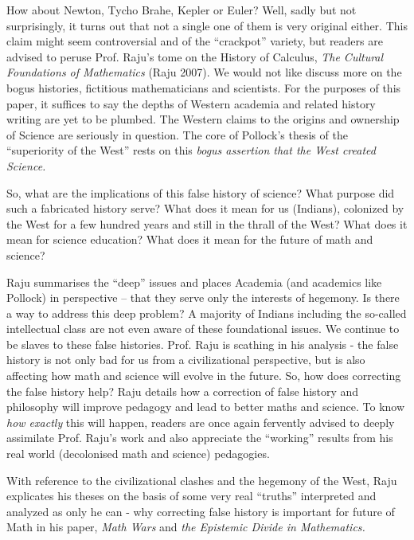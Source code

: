 How about Newton, Tycho Brahe, Kepler or Euler? Well, sadly but not surprisingly, it turns out that not a single one of them is very original either. This claim might seem controversial and of the “crackpot” variety, but readers are advised to peruse Prof. Raju’s tome on the History of Calculus, \textit{The Cultural Foundations of Mathematics} (Raju 2007). We would not like discuss more on the bogus histories, fictitious mathematicians and scientists. For the purposes of this paper, it suffices to say the depths of Western academia and related history writing are yet to be plumbed. The Western claims to the origins and ownership of Science are seriously in question. The core of Pollock’s thesis of the “superiority of the West” rests on this \textit{bogus assertion that the West created Science.}

So, what are the implications of this false history of science? What purpose did such a fabricated history serve? What does it mean for us (Indians), colonized by the West for a few hundred years and still in the thrall of the West? What does it mean for science education? What does it mean for the future of math and science?

Raju summarises the “deep” issues and places Academia (and academics like Pollock) in perspective – that they serve only the interests of hegemony. Is there a way to address this deep problem? A majority of Indians including the so-called intellectual class are not even aware of these foundational issues. We continue to be slaves to these false histories. Prof. Raju is scathing in his analysis - the false history is not only bad for us from a civilizational perspective, but is also affecting how math and science will evolve in the future. So, how does correcting the false history help? Raju details how a correction of false history and philosophy will improve pedagogy and lead to better maths and science. To know \textit{how exactly} this will happen, readers are once again fervently advised to deeply assimilate Prof. Raju’s work and also appreciate the “working” results from his real world (decolonised math and science) pedagogies.

With reference to the civilizational clashes and the hegemony of the West, Raju explicates his theses on the basis of some very real “truths” interpreted and analyzed as only he can - why correcting false history is important for future of Math in his paper, \textit{Math Wars} and \textit{the Epistemic Divide in Mathematics.}

